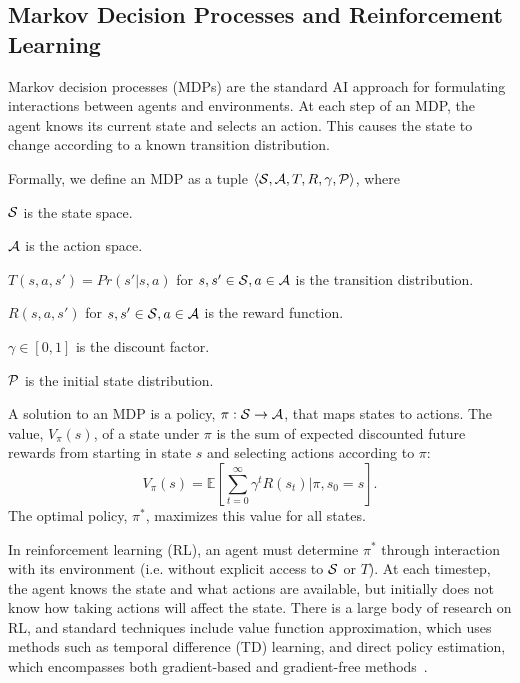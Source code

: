 \subsection{Markov Decision Processes and Reinforcement Learning}
Markov decision processes (MDPs) are the standard AI approach for formulating
interactions between agents and environments. At each step of an MDP,
the agent knows its current state and selects an action. This causes the
state to change according to a known transition distribution.
\begin{defn}
Formally, we define an MDP as a tuple $\langle \mathcal{S}, \mathcal{A}, T, R, \gamma, \mathcal{P} \rangle$, where
\begin{tightlist}
\item $\mathcal{S}$ is the state space.
\item $\mathcal{A}$ is the action space.
\item $T(s, a, s') = Pr(s' | s, a)$ for $s, s' \in \mathcal{S}, a \in \mathcal{A}$ is the transition distribution.
\item $R(s, a, s')$ for $s, s' \in \mathcal{S}, a \in \mathcal{A}$ is the reward function.
\item $\gamma \in [0, 1]$ is the discount factor.
\item $\mathcal{P}$ is the initial state distribution.
\end{tightlist}
\end{defn}
A solution to an MDP is a policy, $\pi: \mathcal{S} \rightarrow \mathcal{A}$, that maps states to
actions. The value, $V_{\pi}(s)$, of a state under $\pi$ is the sum of expected
discounted future rewards from starting in state $s$ and selecting actions according
to $\pi$:
$$V_{\pi}(s) = \mathbb{E}[\sum_{t=0}^{\infty}\gamma^{t}R(s_{t}) | \pi, s_{0} = s].$$
The optimal policy, $\pi^{*}$, maximizes this value for all states.

In reinforcement learning (RL), an agent must determine $\pi^{*}$
through interaction with its environment (i.e. without explicit access
to $\mathcal{S}$ or $T$). At each timestep, the agent knows the state and what
actions are available, but initially does not know how taking actions will
affect the state. There is a large body of research on RL, and
standard techniques include value function approximation, which uses methods such as temporal difference
(TD) learning, and direct policy estimation, which encompasses both gradient-based
and gradient-free methods~\cite{suttonbarto}.


